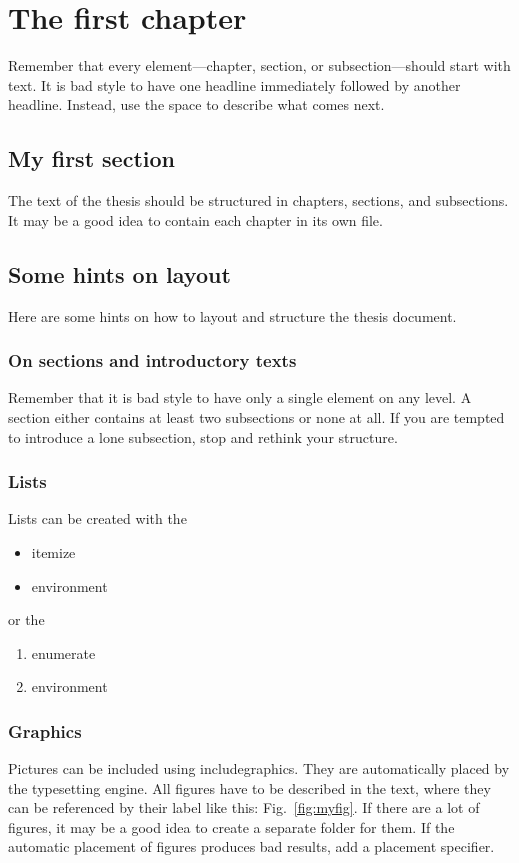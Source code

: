 \chapter{The first chapter}
Remember that every element---chapter, section, or subsection---should start with text.
It is bad style to have one headline immediately followed by another headline. Instead,
use the space to describe what comes next.

\section{My first section}
The text of the thesis should be structured in chapters, sections,
and subsections. It may be a good idea to contain each chapter
in its own file.

\section{Some hints on layout}
Here are some hints on how to layout and structure the thesis document.

\subsection{On sections and introductory texts}
Remember that it is bad style to have only a single element on any level.
A section either contains at least two subsections or none at all. If you
are tempted to introduce a lone subsection, stop and rethink your structure.

\subsection{Lists}
Lists can be created with the
\begin{itemize}
	\item itemize
	\item environment
\end{itemize}
or the
\begin{enumerate}
	\item enumerate
	\item environment
\end{enumerate}
\subsection{Graphics}
Pictures can be included using includegraphics. They are automatically placed
by the typesetting engine. All figures have to be described in the text, where
they can be referenced by their label like this: Fig.~\ref{fig:myfig}. If there
are a lot of figures, it may be a good idea to create a separate folder for them.
If the automatic placement of figures produces bad results, add a placement
specifier.

